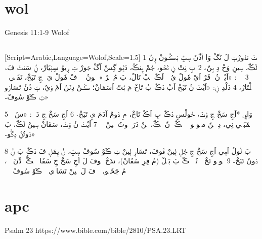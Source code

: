 \documentclass[12pt,fleqn,titlepage,twoside,a4paper]{book}
\begin{document}
\section{wol}

Genesis 11:1-9 Wolof

\begin{arab}[utf]
\section*{}
[Script=Arabic,Language=Wolof,Scale=1.5]
1 ݖَ ندࣷورْتࣹ لَ نَگْ وَا اࣵدِّنَ سࣺݒَّ بࣷڪّࣷونْ وࣹنّ لࣵڪّ، سࣹينِ وَخْ دِ بࣹنّ؞
2 بِ نِتْ ݧِ تࣷخࣷو، جࣴمْ ݒࣹنڪُ، دَݧࣷو گِسْ اَگْ جࣷورْ ݖِ رࣺيوُ سِنࣹيَارْ، ݧُ سَنݖّ فَ؞
3 ݧُ نࣹ: «اَيْݖَ نُ دࣹفَرْ اَيْ مٗولْ يُ ݧُ لَڪّ ݖِبْ تَالْ، بَ مُ ݧࣷرْ؞» نࣷونُ ݧُ دࣹفْ مٗولْ يَ دࣷجِ تَبَخْ، تَقَلࣹي ڪࣷ ڪࣷلْتَارْ،
4 دَلْدِ نࣹ: «اَيْݖَ نُ تَبَخْ اَبْ دࣴڪّ بُ تَاخْ مَ بࣴتّ اَسَمَانْ؛ ڪࣷنْ دِنَنُ اَمْ وࣷيْ، تࣹ دُنُ تَسَارࣷو ݖِ ڪَوْ سُوفْ؞»

5 وَايࣹ *اَجِ سَخْ جِ وࣵݖّ، خࣷولْسِ دࣴڪّ بِ اَڪْ تَاخْ، مِ دࣷومْ آدَمَ يِ تَبَخْ؞
 6 اَجِ سَخْ جِ دَ نࣹ: «سُ ݧُ تࣵمْبَلࣹي نِي، دِ مࣹنّ مبࣷولࣷو تࣹ بࣷڪّ وࣹنّ لࣵڪّ، ڪࣷنْ دَرَ دࣷوتُ لࣹينْ تࣴ؞
7 اَيْݖَ نُ وࣵݖّ، سَفَانْ سࣹينْ لࣵڪّ، بَ دࣷوتُݧُ دࣺگّࣷو؞»

8 بَ لࣷولُ اَمࣹي اَجِ سَخْ جِ جࣴلࣹ لࣹينْ فࣷوفَ، تَسَارࣹ لࣹينْ ݖِ ڪَوْ سُوفْ سࣺݒّ، ݧُ يࣹمَلࣹ فَ دࣴڪّ بَ ݧُ دࣷونْ تَبَخْ؞
9 لࣷولࣷو تَخْ ݧُ تُدّࣹ دࣴڪّ بَ بَبࣹلْ (مُ فِرِ سَفَانْ)، ندَخْ فࣷوفَ لَ اَجِ سَخْ جِ سَفَانࣹ لࣵڪُّ اࣵدِّنَ سࣺݒّ، مُ جَخَسࣷو، تࣹ فَ لَ لࣹينْ تَسَارࣹي ݖِ ڪَوْ سُوفْ سࣺݒّ؞

\end{arab}

\section{apc}

Psalm 23 https://www.bible.com/bible/2810/PSA.23.LRT
\end{document}
